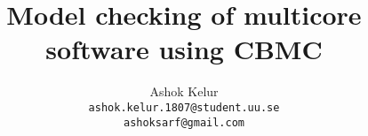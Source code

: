 \documentclass[titlepage]{book}
\begin{document}
\begin{titlepage}
\author{Ashok Kelur\\\texttt{ashok.kelur.1807@student.uu.se}\\\texttt{ashoksarf@gmail.com}}
\title{Model checking of multicore software using CBMC}
\thispagestyle{empty}
\end{titlepage}
\date{}






\newif\ifericsson

\begin{comment}
\newpage
\centering{And as in Arithmetique, unpractised men must, and Professors themselves may often erre, and cast up false; so also in any other subject of Reasoning, the ablest, most attentive, and most practised men, may deceive themselves, and inferre false Conclusions, Not but that Reason it selfe is alwayes Right Reason, as well as Arithmetique is a certain and infallible Art: But no one mans Reason, nor the Reason of any one number of men, makes the certaintie; no more than an account is therefore well cast up, because a great many men have unanimously approved it.}

- Leviathan, Thomas Hobbes
\newpage

\section{Abstract}


Computers have been key subsystems in various complex systems. As computers are adapted into various fields, hardware and software are increasing in size and complexity. It is evident that parallel computing is the way to solve large scale complex information technology problems.

Engineers designing hardware and software are required to verify the system for correctness. As system's size and complexity increases, it is difficult to perform manual system verification. Model checking converts a hardware or software solution into temporal logic and uses solvers to assert on properties of solution. A Bounded Model Checker can verify properties of program/logic within bounded limits. CBMC \index{CBMC}is a Bounded Model Checker for ANSI-C and C++ programs.


\end{comment}
\end{document}

